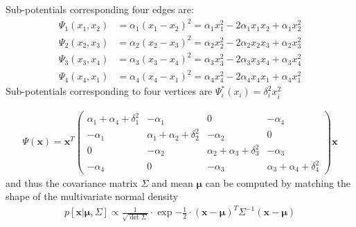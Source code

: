 \documentclass[landscape,footrule]{foils}
\renewcommand{\vec}[1]{\boldsymbol{#1}}
\begin{document}
Sub-potentials corresponding four edges are:  
\begin{align*}
\Psi_1(x_1,x_2)&= \alpha_1(x_{1}-x_2)^2=\alpha_1 x_1^2-2\alpha_1 x_1x_2+\alpha_1 x_2^2\\
\Psi_2(x_2,x_3)&= \alpha_2(x_{2}-x_3)^2=\alpha_2 x_2^2-2\alpha_2 x_2x_3+\alpha_2 x_3^2\\
\Psi_3(x_3,x_4)&= \alpha_3(x_{3}-x_4)^2=\alpha_3 x_3^2-2\alpha_3 x_3x_4+\alpha_3 x_4^2\\
\Psi_4(x_4,x_1)&= \alpha_4(x_{4}-x_1)^2=\alpha_4 x_4^2-2\alpha_4 x_4x_1+\alpha_4 x_1^2
\end{align*}
Sub-potentials corresponding to four vertices are $\Psi_i^*(x_i)=\delta_i^2 x_i^2$ 


\begin{align*}
\Psi(\vec{x})=\vec{x}^T
\begin{pmatrix}
\alpha_1+\alpha_4+\delta_1^2 & -\alpha_1 & 0 & -\alpha_4\\
-\alpha_1 &\alpha_1+\alpha_2+\delta_2^2 & -\alpha_2 & 0 \\
0 &-\alpha_2 &\alpha_2+\alpha_3+\delta_3^2 & -\alpha_3 \\
-\alpha_4 & 0 &-\alpha_3 &\alpha_3+\alpha_4+\delta_4^2 
\end{pmatrix}
\vec{x}
\end{align*}
and thus the covariance matrix $\Sigma$ and mean $\vec{\mu}$ can be computed by matching the shape of the multivariate normal density
\begin{align*}
p[\vec{x}|\vec{\mu},\Sigma]\propto\frac{1}{\sqrt{\det\Sigma}}\cdot\exp{-\frac{1}{2}\cdot 
(\vec{x}-\vec{\mu})^T\Sigma^{-1}(\vec{x}-\vec{\mu})}
\end{align*}
\end{document}
